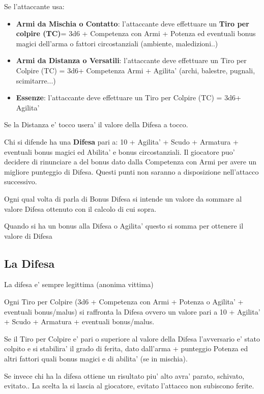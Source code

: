 \documentclass[a4paper,11pt,twoside,openany]{dndbook}
\begin{document}
Se l'attaccante usa:

\begin{itemize}
	\item \textbf{Armi da Mischia o Contatto}: l'attaccante deve effettuare un \textbf{Tiro per colpire (TC)}= 3d6 + Competenza con Armi + Potenza ed eventuali bonus magici dell'arma o fattori circostanziali (ambiente, maledizioni..)
	\item
	\textbf{Armi da Distanza o Versatili}: l'attaccante deve effettuare un Tiro per Colpire (TC) = 3d6+ Competenza Armi + Agilita' (archi, balestre, pugnali, scimitarre...)
	\item	\textbf{Essenze}: l'attaccante deve effettuare un Tiro per Colpire (TC) = 3d6+ Agilita' 
\end{itemize}

Se la Distanza e' tocco usera' il valore della Difesa a tocco.

Chi si difende ha una \textbf{Difesa} pari a: 10 + Agilita' + Scudo + Armatura + eventuali bonus magici ed Abilita' e bonus circostanziali. 
Il giocatore puo' decidere di rinunciare a del bonus dato dalla Competenza con Armi per avere un migliore punteggio di Difesa. Questi punti non saranno a disposizione nell'attacco successivo.

Ogni qual volta di parla di Bonus Difesa si intende un valore da sommare al valore Difesa ottenuto con il calcolo di cui sopra.

Quando si ha un bonus alla Difesa o Agilita' questo si somma per ottenere il valore di Difesa

\subsection{La Difesa}

\label{la-difesa}
\begin{quotebox}
		La difesa e' sempre legittima (anonima vittima)
\end{quotebox}
Ogni Tiro per Colpire (3d6 + Competenza con Armi + Potenza o Agilita' + eventuali bonus/malus) si raffronta la Difesa ovvero un valore pari a 10 + Agilita' + Scudo + Armatura + eventuali bonus/malus.

Se il Tiro per Colpire e' pari o superiore al valore della Difesa l'avversario e' stato colpito e si stabilira' il grado di ferita, dato dall'arma + punteggio Potenza ed altri fattori quali bonus magici e di abilita' (se in mischia).

Se invece chi ha la difesa ottiene un risultato piu' alto avra' parato, schivato, evitato.. La scelta la si lascia al giocatore, evitato l'attacco non subiscono ferite.
\end{document}
